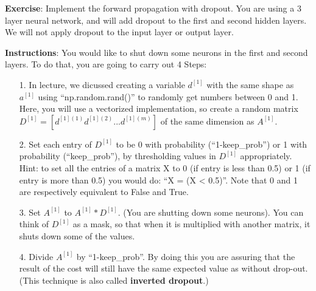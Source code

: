 \begin{tcolorbox}[title=Forward propagation with dropout]
{\textbf {Exercise}}: Implement the forward propagation with dropout. You are using a 3 layer neural network, and will add dropout to the first and second hidden layers. We will not apply dropout to the input layer or output layer. 

{\textbf {Instructions}}:
You would like to shut down some neurons in the first and second layers. To do that, you are going to carry out 4 Steps:
\begin{itemize}
\item[1.] In lecture, we dicussed creating a variable $d^{[1]}$ with the same shape as $a^{[1]}$ using 	``np.random.rand()'' to randomly get numbers between 0 and 1. Here, you will use a vectorized implementation, so create a random matrix $D^{[1]} = [d^{[1](1)} d^{[1](2)} ... d^{[1](m)}] $ of the same dimension as $A^{[1]}$.
\item[2.] Set each entry of $D^{[1]}$ to be 0 with probability (``1-keep\_prob'') or 1 with probability (``keep\_prob''), by thresholding values in $D^{[1]}$ appropriately. Hint: to set all the entries of a matrix X to 0 (if entry is less than 0.5) or 1 (if entry is more than 0.5) you would do: ``X = (X < 0.5)''. Note that 0 and 1 are respectively equivalent to False and True.
\item[3.] Set $A^{[1]}$ to $A^{[1]} * D^{[1]}$. (You are shutting down some neurons). You can think of $D^{[1]}$ as a mask, so that when it is multiplied with another matrix, it shuts down some of the values.
\item[4.] Divide $A^{[1]}$ by ``1-keep\_prob''. By doing this you are assuring that the result of the cost will still have the same expected value as without drop-out. (This technique is also called {\textbf {inverted dropout}}.)
\end{itemize}

\end{tcolorbox}

